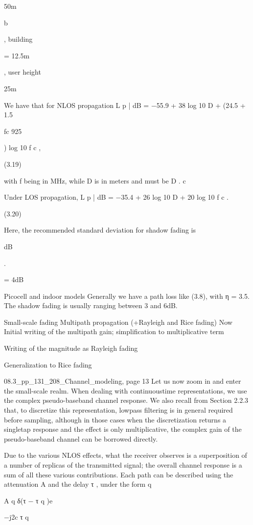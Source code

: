 {{{{50m

b

, building

= 12.5m

, user height

25m

We have that for NLOS propagation L p | dB = −55.9 + 38 log 10 D + (24.5 + 1.5

fc 925

) log 10 f c ,

(3.19)

with f being in MHz, while D is in meters and must be D .
c

Under LOS propagation,
L p | dB = −35.4 + 26 log 10 D + 20 log 10 f c .

(3.20)

Here, the recommended standard deviation for shadow fading is \sigma

dB

.

= 4dB

Picocell and indoor models Generally we have a path loss like (3.8), with η = 3.5.
The shadow fading is usually ranging between 3 and 6dB.

Small-scale fading Multipath propagation (+Rayleigh and Rice fading)
Now Initial writing of the multipath gain;
simplification to multiplicative term

Writing of the magnitude as Rayleigh fading

Generalization to Rice fading

08.3_pp_131_208_Channel_modeling, page 13 Let us now zoom in and enter the small-scale realm. When dealing with continuoustime representations, we use the complex pseudo-baseband channel response. We also recall from Section 2.2.3 that, to discretize this representation, lowpass filtering is in general required before sampling, although in those cases when the discretization returns a singletap response and the effect is only multiplicative, the complex gain of the pseudo-baseband channel can be borrowed directly.

Due to the various NLOS effects, what the receiver observes is a superposition of a number of replicas of the transmitted signal; the overall channel response is a sum of all these various contributions.
Each path can be described using the attenuation A and the delay τ , under the form q

A q δ(τ − τ q )e

−j2\pif c τ q

}}}}
